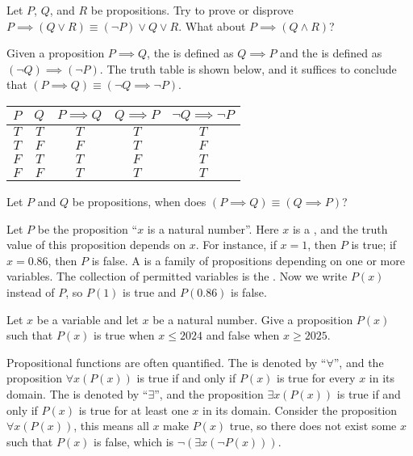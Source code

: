 \documentclass[10pt]{article}
\begin{document}
\begin{problem}
    Let $P$, $Q$, and $R$ be propositions. Try to prove or disprove $P\implies(Q\vee R)\equiv(\neg P)\vee Q\vee R$. What about $P\implies(Q\wedge R)$?
\end{problem}
\par
Given a proposition $P\implies Q$, the  is defined as $Q\implies P$ and the  is defined as $(\neg Q)\implies(\neg P)$. The truth table is shown below, and it suffices to conclude that $(P\implies Q)\equiv(\neg Q\implies\neg P)$.
\begin{center}
    \begin{tabular}{cc|ccc}
        $P$ & $Q$ & $P\implies Q$ & $Q\implies P$ & $\neg Q\implies\neg P$ \\
        \hline
        $T$ & $T$ & $T$ & $T$ & $T$ \\
        $T$ & $F$ & $F$ & $T$ & $F$ \\
        $F$ & $T$ & $T$ & $F$ & $T$ \\
        $F$ & $F$ & $T$ & $T$ & $T$
    \end{tabular}
\end{center}
\begin{problem}
    Let $P$ and $Q$ be propositions, when does $(P\implies Q)\equiv(Q\implies P)$?
\end{problem}
\par
Let $P$ be the proposition ``$x$ is a natural number''. Here $x$ is a , and the truth value of this proposition depends on $x$. For instance, if $x=1$, then $P$ is true; if $x=0.86$, then $P$ is false. A  is a family of propositions depending on one or more variables. The collection of permitted variables is the . Now we write $P(x)$ instead of $P$, so $P(1)$ is true and $P(0.86)$ is false.
\begin{problem}
    Let $x$ be a variable and let $x$ be a natural number. Give a proposition $P(x)$ such that $P(x)$ is true when $x\le 2024$ and false when $x\ge 2025$.
\end{problem}
\par
Propositional functions are often quantified. The  is denoted by ``$\forall$'', and the proposition $\forall x(P(x))$ is true if and only if $P(x)$ is true for every $x$ in its domain. The  is denoted by ``$\exists$'', and the proposition $\exists x(P(x))$ is true if and only if $P(x)$ is true for at least one $x$ in its domain. Consider the proposition $\forall x(P(x))$, this means all $x$ make $P(x)$ true, so there does not exist some $x$ such that $P(x)$ is false, which is $\neg(\exists x(\neg P(x)))$.
\end{document}
